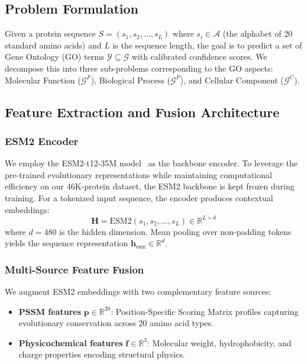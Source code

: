 \documentclass[conference]{IEEEtran}
\begin{document}
\subsection{Problem Formulation}
Given a protein sequence $S = (s_1, s_2, \ldots, s_L)$ where $s_i \in \mathcal{A}$ (the alphabet of 20 standard amino acids) and $L$ is the sequence length, the goal is to predict a set of Gene Ontology (GO) terms $\mathcal{Y} \subseteq \mathcal{G}$ with calibrated confidence scores. We decompose this into three sub-problems corresponding to the GO aspects: Molecular Function ($\mathcal{G}^F$), Biological Process ($\mathcal{G}^P$), and Cellular Component ($\mathcal{G}^C$).

\subsection{Feature Extraction and Fusion Architecture}

\subsubsection{ESM2 Encoder}
We employ the ESM2-t12-35M model~\cite{lin2023} as the backbone encoder. To leverage the pre-trained evolutionary representations while maintaining computational efficiency on our 46K-protein dataset, the ESM2 backbone is kept frozen during training. For a tokenized input sequence, the encoder produces contextual embeddings:
\begin{equation}
    \mathbf{H} = \text{ESM2}(s_1, s_2, \ldots, s_L) \in \mathbb{R}^{L \times d}
\end{equation}
where $d = 480$ is the hidden dimension. Mean pooling over non-padding tokens yields the sequence representation $\mathbf{h}_{\text{esm}} \in \mathbb{R}^d$.

\subsubsection{Multi-Source Feature Fusion}
We augment ESM2 embeddings with two complementary feature sources:

\begin{itemize}
    \item \textbf{PSSM features} $\mathbf{p} \in \mathbb{R}^{20}$: Position-Specific Scoring Matrix profiles capturing evolutionary conservation across 20 amino acid types.
    \item \textbf{Physicochemical features} $\mathbf{f} \in \mathbb{R}^{3}$: Molecular weight, hydrophobicity, and charge properties encoding structural physics.
\end{itemize}
\end{document}
